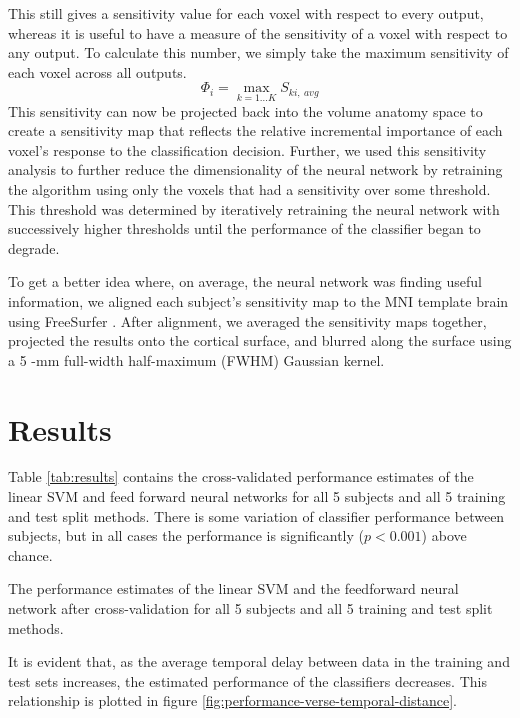 \documentclass[preprint,5p,authoryear]{elsarticle}
\begin{document}
This still gives a sensitivity value for each voxel with respect to every output, whereas it is useful to have a measure of the sensitivity of a voxel with respect to any output.
To calculate this number, we simply take the maximum sensitivity of each voxel across all outputs.
\begin{equation}
\Phi_{i} = \max_{k=1 \dots K}{S_{ki,~avg}}
\end{equation}
This sensitivity can now be projected back into the volume anatomy space to create a sensitivity map that reflects the relative incremental importance of each voxel's response to the classification decision.
Further, we used this sensitivity analysis to further reduce the dimensionality of the neural network by retraining the algorithm using only the voxels that had a sensitivity over some threshold.
This threshold was determined by iteratively retraining the neural network with successively higher thresholds until the performance of the classifier began to degrade.

To get a better idea where, on average, the neural network was finding useful information, we aligned each subject's sensitivity map to the MNI template brain \citep{MNItemplate} using FreeSurfer \citep{FreeSurfer}.
After alignment, we averaged the sensitivity maps together, projected the results onto the cortical surface, and blurred along the surface using a 5 -mm full-width half-maximum (FWHM) Gaussian kernel.

\section{Results}
Table \ref{tab:results} contains the cross-validated performance estimates of the linear SVM and feed forward neural networks for all 5 subjects and all 5 training and test split methods.
There is some variation of classifier performance between subjects, but in all cases the performance is significantly ($p < 0.001$) above chance. 

\begin{table}
\centering

\caption{The performance estimates of the linear SVM and the feedforward neural network after cross-validation for all 5 subjects and all 5 training and test split methods. }
\label{tab:results}
\end{table}

It is evident that, as the average temporal delay between data in the training and test sets increases, the estimated performance of the classifiers decreases.
This relationship is plotted in figure \ref{fig:performance-verse-temporal-distance}.
\end{document}
